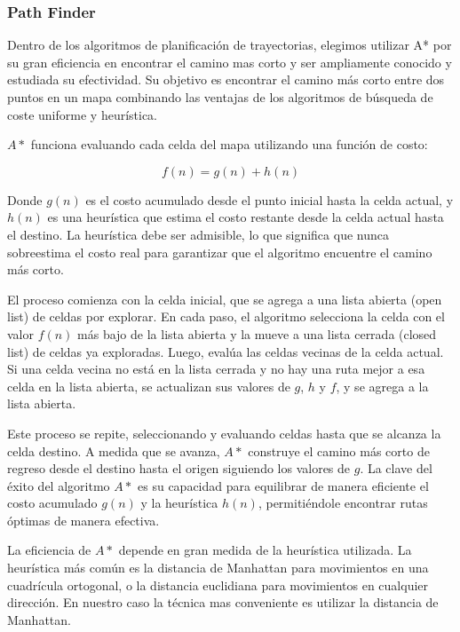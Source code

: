 \subsubsection{Path Finder}

Dentro de los algoritmos de planificación de trayectorias, elegimos utilizar A* por su gran eficiencia en encontrar el camino mas corto y ser ampliamente conocido y estudiada su efectividad. Su objetivo es encontrar el camino más corto entre dos puntos en un mapa combinando las ventajas de los algoritmos de búsqueda de coste uniforme y heurística. \cite{sariffpathplan} \cite{cuevaspathfinding}

$A*$ funciona evaluando cada celda del mapa utilizando una función de costo:

$$ f(n) = g(n) + h(n) $$

Donde $g(n)$ es el costo acumulado desde el punto inicial hasta la celda actual, y $h(n)$ es una heurística que estima el costo restante desde la celda actual hasta el destino. La heurística debe ser admisible, lo que significa que nunca sobreestima el costo real para garantizar que el algoritmo encuentre el camino más corto.

El proceso comienza con la celda inicial, que se agrega a una lista abierta (open list) de celdas por explorar. En cada paso, el algoritmo selecciona la celda con el valor $f(n)$ más bajo de la lista abierta y la mueve a una lista cerrada (closed list) de celdas ya exploradas. Luego, evalúa las celdas vecinas de la celda actual. Si una celda vecina no está en la lista cerrada y no hay una ruta mejor a esa celda en la lista abierta, se actualizan sus valores de $g$, $h$ y $f$, y se agrega a la lista abierta.

Este proceso se repite, seleccionando y evaluando celdas hasta que se alcanza la celda destino. A medida que se avanza, $A*$ construye el camino más corto de regreso desde el destino hasta el origen siguiendo los valores de $g$. La clave del éxito del algoritmo $A*$ es su capacidad para equilibrar de manera eficiente el costo acumulado $g(n)$ y la heurística $h(n)$, permitiéndole encontrar rutas óptimas de manera efectiva.

La eficiencia de $A*$ depende en gran medida de la heurística utilizada. La heurística más común es la distancia de Manhattan para movimientos en una cuadrícula ortogonal, o la distancia euclidiana para movimientos en cualquier dirección. En nuestro caso la técnica mas conveniente es utilizar la distancia de Manhattan.

